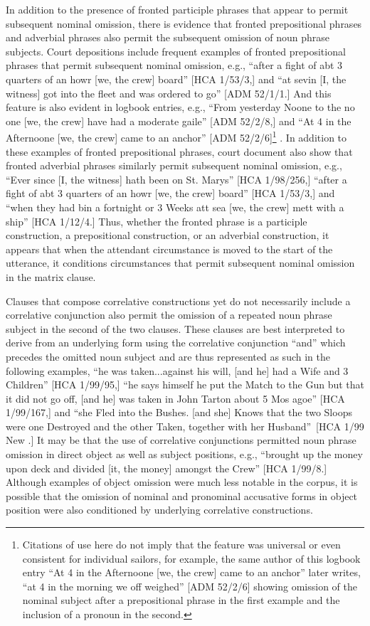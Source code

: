 In addition to the presence of fronted participle phrases that appear to permit subsequent nominal omission, there is evidence that fronted prepositional phrases and adverbial phrases also permit the subsequent omission of noun phrase subjects. Court depositions include frequent examples of fronted prepositional phrases that permit subsequent nominal omission, e.g., “after a fight of abt 3 quarters of an howr [we, the crew] board” [HCA 1/53/3,] and “at sevin [I, the witness] got into the fleet and was ordered to go” [ADM 52/1/1.] And this feature is also evident in logbook entries, e.g., “From yesterday Noone to the no one [we, the crew] have had a moderate gaile” [ADM 52/2/8,] and “At 4 in the Afternoone [we, the crew] came to an anchor” [ADM 52/2/6]\footnote{Citations of use here do not imply that the feature was universal or even consistent for individual sailors, for example, the same author of this logbook entry “At 4 in the Afternoone [we, the crew] came to an anchor” later writes, “at 4 in the morning we off weighed” [ADM 52/2/6] showing omission of the nominal subject after a prepositional phrase in the first example and the inclusion of a pronoun in the second.} .  In addition to these examples of fronted prepositional phrases, court document also show that fronted adverbial phrases similarly permit subsequent nominal omission, e.g., “Ever since [I, the witness] hath been on St. Marys” [HCA 1/98/256,] “after a fight of abt 3 quarters of an howr [we, the crew] board” [HCA 1/53/3,] and “when they had bin a fortnight or 3 Weeks att sea [we, the crew] mett with a ship” [HCA 1/12/4.] Thus, whether the fronted phrase is a participle construction, a prepositional construction, or an adverbial construction, it appears that when the attendant circumstance is moved to the start of the utterance, it conditions circumstances that permit subsequent nominal omission in the matrix clause. 

Clauses that compose correlative constructions yet do not necessarily include a correlative conjunction also permit the omission of a repeated noun phrase subject in the second of the two clauses. These clauses are best interpreted to derive from an underlying form using the correlative conjunction “and” which precedes the omitted noun subject and are thus represented as such in the following examples, “he was taken...against his will, [and he] had a Wife and 3 Children” [HCA 1/99/95,] “he says himself he put the Match to the Gun but that it did not go off, [and he] was taken in John Tarton about 5 Mos agoe” [HCA 1/99/167,] and “she Fled into the Bushes. [and she] Knows that the two Sloops were one Destroyed and the other Taken, together with her Husband”~[HCA 1/99 New \citealt{Providence1722}.] It may be that the use of correlative conjunctions permitted noun phrase omission in direct object as well as subject positions, e.g., “brought up the money upon deck and divided [it, the money] amongst the Crew” [HCA 1/99/8.] Although examples of object omission were much less notable in the corpus, it is possible that the omission of nominal and pronominal accusative forms in object position were also conditioned by underlying correlative constructions. 

